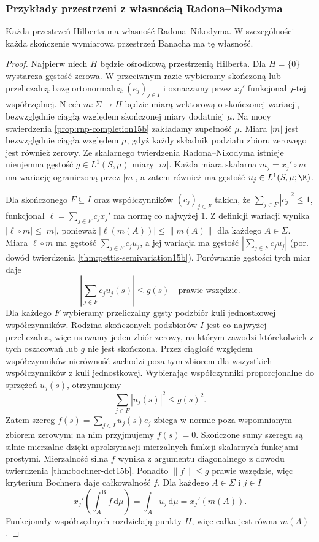 \subsubsection{Przykłady przestrzeni z własnością Radona--Nikodyma}

\begin{twierdzenie}
\label{thm:rnp-separable-hilbert15b}
\label{thm:rnp-hilbert15b}
Każda przestrzeń Hilberta ma własność
Radona--Nikodyma. W szczególności każda skończenie
wymiarowa przestrzeń Banacha ma tę własność.
\end{twierdzenie}
\begin{proof}
Najpierw niech $H$ będzie ośrodkową przestrzenią Hilberta.
Dla $H=\{0\}$ wystarcza gęstość zerowa.
W przeciwnym razie wybieramy skończoną lub przeliczalną
bazę ortonormalną $(e_j)_{j\in I}$ i oznaczamy przez
$x_j'$ funkcjonał $j$-tej współrzędnej.
Niech $m:\Sigma\to H$ będzie miarą wektorową o skończonej
wariacji, bezwzględnie ciągłą względem skończonej miary
dodatniej $\mu$. Na mocy stwierdzenia
\ref{prop:rnp-completion15b} zakładamy zupełność $\mu$.
Miara $|m|$ jest bezwzględnie ciągła względem $\mu$,
gdyż każdy składnik podziału zbioru zerowego jest
również zerowy. Ze skalarnego twierdzenia Radona--Nikodyma
istnieje nieujemna gęstość $g\in L^1(S,\mu)$ miary $|m|$.
Każda miara skalarna $m_j=x_j'\circ m$ ma wariację
ograniczoną przez $|m|$, a zatem również ma gęstość
$u_j\in L^1(S,\mu;\K)$.

Dla skończonego $F\subseteq I$ oraz współczynników
$(c_j)_{j\in F}$ takich, że $\sum_{j\in F}|c_j|^2\le1$,
funkcjonał $\ell=\sum_{j\in F}c_jx_j'$ ma normę
co najwyżej $1$. Z definicji wariacji wynika
$|\ell\circ m|\le |m|$, ponieważ
$|\ell(m(A))|\le\|m(A)\|$ dla każdego $A\in\Sigma$.
Miara $\ell\circ m$ ma gęstość $\sum_{j\in F}c_ju_j$,
a jej wariacja ma gęstość
$|\sum_{j\in F}c_ju_j|$ (por. dowód twierdzenia
\ref{thm:pettis-semivariation15b}).
Porównanie gęstości tych miar daje
\[
 \left|\sum_{j\in F}c_ju_j(s)\right|\le g(s)
 \quad\text{prawie wszędzie}.
\]
Dla każdego $F$ wybieramy przeliczalny gęsty podzbiór
kuli jednostkowej współczynników. Rodzina skończonych
podzbiorów $I$ jest co najwyżej przeliczalna,
więc usuwamy jeden zbiór zerowy, na którym zawodzi
którekolwiek z tych oszacowań lub $g$ nie jest skończona.
Przez ciągłość względem współczynników nierówność
zachodzi poza tym zbiorem dla wszystkich współczynników
z kuli jednostkowej. Wybierając współczynniki
proporcjonalne do sprzężeń $u_j(s)$, otrzymujemy
\[
 \sum_{j\in F}|u_j(s)|^2\le g(s)^2.
\]
Zatem szereg $f(s)=\sum_{j\in I}u_j(s)e_j$ zbiega
w normie poza wspomnianym zbiorem zerowym; na nim
przyjmujemy $f(s)=0$.
Skończone sumy szeregu są silnie mierzalne dzięki
aproksymacji mierzalnych funkcji skalarnych funkcjami
prostymi. Mierzalność silna $f$ wynika z argumentu
diagonalnego z dowodu twierdzenia
\ref{thm:bochner-dct15b}. Ponadto $\|f\|\le g$
prawie wszędzie, więc kryterium Bochnera daje
całkowalność $f$. Dla każdego $A\in\Sigma$ i $j\in I$
\[
 x_j'\left(\int_A^{\mathrm B}f\,\mathrm d\mu\right)
 =\int_Au_j\,\mathrm d\mu=x_j'(m(A)).
\]
Funkcjonały współrzędnych rozdzielają punkty $H$,
więc całka jest równa $m(A)$.


\end{proof}
